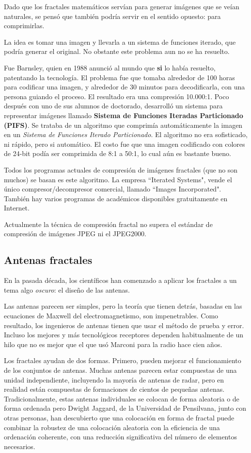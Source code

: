\begin{example}
Dado que los fractales matemáticos servían para generar imágenes que se veían naturales, se pensó que también podría servir en el sentido opuesto: para comprimirlas.

La idea es tomar una imagen y llevarla a un sistema de funciones iterado, que podría generar el original. No obstante este problema aun no se ha resuelto.

Fue Barnsley, quien en 1988 anunció al mundo que \textbf{si} lo había resuelto, patentando la tecnología. El problema fue que tomaba alrededor de 100 horas para codificar una imagen, y alrededor de 30 minutos para decodificarla, con una persona guiando el proceso. El resultado era una compresión 10.000:1. Poco después con uno de sus alumnos de doctorado, desarrolló un sistema para representar imágenes llamado \textbf{Sistema de Funciones Iteradas Particionado (PIFS)}. Se trataba de un algoritmo que comprimía automáticamente la imagen en un \emph{Sistema de Funciones Iterado Particionado}. El algoritmo no era sofisticado, ni rápido, pero si automático. El costo fue que una imagen codificado con colores de 24-bit podía ser comprimida de 8:1 a 50:1, lo cual aún es bastante bueno.

Todos los programas actuales de compresión de imágenes fractales (que no son muchos) se basan es este algoritmo. La empresa ``Iterated Systems", vende el único compresor/decompresor comercial, llamado ``Images Incorporated". También hay varios programas de académicos disponibles gratuitamente en Internet.

Actualmente la técnica de compresión fractal no supera el estándar de compresión de imágenes JPEG ni el JPEG2000.

\subsection{Antenas fractales}

En la pasada década, los científicos han comenzado a aplicar los fractales a un tema algo \emph{oscuro}: el diseño de las antenas.

Las antenas parecen ser simples, pero la teoría que tienen detrás, basadas en las ecuaciones de Maxwell del electromagnetismo, son impenetrables. Como resultado, los ingenieros de antenas tienen que usar el método de prueba y error. Incluso los mejores y más tecnológicos receptores dependen habitualmente de un hilo que no es mejor que el que usó Marconi para la radio hace cien años.

Los fractales ayudan de dos formas. Primero, pueden mejorar el funcionamiento de los conjuntos de antenas. Muchas antenas parecen estar compuestas de una unidad independiente, incluyendo la mayoría de antenas de radar, pero en realidad están compuestas de formaciones de cientos de pequeñas antenas. Tradicionalmente, estas antenas individuales se colocan de forma aleatoria o de forma ordenada pero Dwight Jaggard, de la Universidad de Pensilvana, junto con otras personas, han descubierto que una colocación en forma de fractal puede combinar la robustez de una colocación aleatoria con la eficiencia de una ordenación coherente, con una reducción significativa del número de elementos necesarios.


\end{example}
